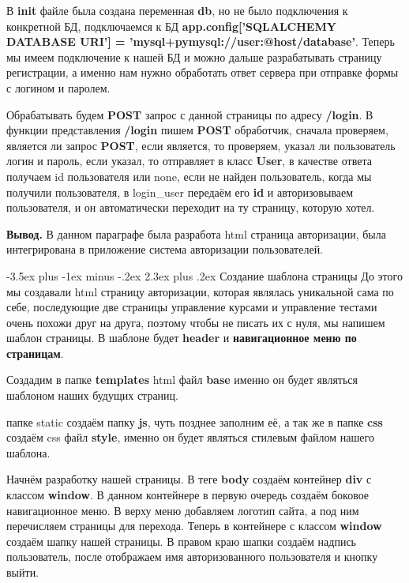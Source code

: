 \documentclass[12pt, oldlfont, amsfonts]{report}
\makeatletter
\renewcommand{\section}{\@startsection{section}{1}{0pt}%
                                {-3.5ex plus -1ex minus -.2ex}%
                                {2.3ex plus .2ex}%
{\centering\hyphenpenalty=10000\normalfont\Large\bfseries}}
\makeatother
\begin{document}
В {\bf init} файле была создана переменная {\bf db}, но не было подключения к конкретной БД, подключаемся к БД {\bf app.config['SQLALCHEMY DATABASE URI'] = 'mysql+pymysql://user:@host/database'}. Теперь мы имеем подключение к нашей БД и можно дальше разрабатывать страницу регистрации, а именно нам нужно обработать ответ сервера при отправке формы с логином и паролем. 

Обрабатывать будем {\bf POST} запрос с данной страницы по адресу {\bf /login}. В функции представления {\bf /login} пишем {\bf POST} обработчик, сначала проверяем, является ли запрос {\bf POST}, если является, то проверяем, указал ли пользователь логин и пароль, если указал, то отправляет в класс {\bf User}, в качестве ответа получаем id пользователя или none, если не найден пользователь, когда мы получили пользователя, в login\_user передаём его {\bf id} и авторизовываем пользователя, и он автоматически переходит на ту страницу, которую хотел.

{\bf Вывод.} В данном параграфе была разработа html страница авторизации, была интегрирована в приложение система авторизации пользователей.

\section{Создание шаблона страницы}
До этого мы создавали html страницу авторизации, которая являлась уникальной сама по себе, последующие две страницы управление курсами и управление тестами очень похожи друг на друга, поэтому чтобы не писать их с нуля, мы напишем шаблон страницы. В шаблоне будет {\bf header} и {\bf навигационное меню по страницам}.

Создадим в папке {\bf templates} html файл {\bf base} именно он будет являться шаблоном наших будущих страниц. 

  папке static создаём папку {\bf js}, чуть позднее заполним её, а так же в папке {\bf css} создаём css файл {\bf style}, именно он будет являться стилевым файлом нашего шаблона.

Начнём разработку нашей страницы. В теге {\bf body} создаём контейнер {\bf div} с классом {\bf window}. В данном контейнере в первую очередь создаём боковое навигационное меню. В верху меню добавляем логотип сайта, а под ним перечисляем страницы для перехода. Теперь в контейнере с классом {\bf window} создаём шапку нашей страницы. В правом краю шапки создаём надпись пользователь, после отображаем имя авторизованного пользователя и кнопку выйти.
\end{document}
